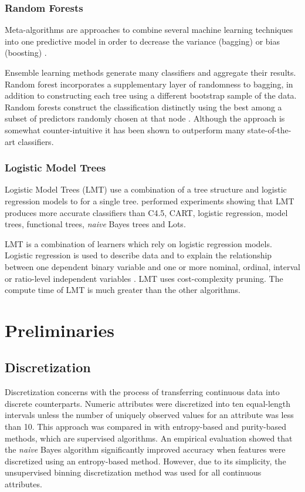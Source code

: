 \documentclass{cmppgr}
\begin{document}
\subsubsection{Random Forests}
Meta-algorithms are approaches to combine several machine learning techniques into one predictive model in order to decrease the variance (bagging) or bias (boosting) \cite{galkin}. 


Ensemble learning methods generate many classifiers and aggregate their results. Random forest incorporates a supplementary layer of randomness to bagging, in addition to constructing each tree using a different bootstrap sample of the data.
Random forests construct the classification distinctly using the best among a subset of predictors randomly chosen at that node \cite{liaw2002classification}. Although the approach is somewhat counter-intuitive it has been shown to outperform many state-of-the-art classifiers.


\subsubsection{Logistic Model Trees}
Logistic Model Trees (LMT) use a combination of a tree structure and logistic regression models to for a single tree. \cite{landwehr2005logistic} performed experiments showing that LMT produces more accurate classifiers than C4.5, CART, logistic regression, model trees, functional trees, \textit{naive} Bayes trees and Lots.


LMT is a combination of learners which rely on logistic regression models.
Logistic regression is used to describe data and to explain the relationship between one dependent binary variable and one or more nominal, ordinal, interval or ratio-level independent variables \cite{statistics_solutions}. LMT uses cost-complexity pruning. The compute time of LMT is much greater than the other algorithms.

\section{Preliminaries}
\subsection{Discretization}
Discretization concerns with the process of transferring continuous data into discrete counterparts. Numeric attributes were discretized into ten equal-length intervals unless the number of uniquely observed values for an attribute was less than 10. This approach was compared in \cite{dougherty1995supervised} with entropy-based and purity-based methods, which are supervised algorithms. An empirical evaluation showed that the \textit{naive} Bayes algorithm significantly improved accuracy when features were discretized using an entropy-based method. However, due to its simplicity, the unsupervised binning discretization method was used for all continuous attributes.
\end{document}
